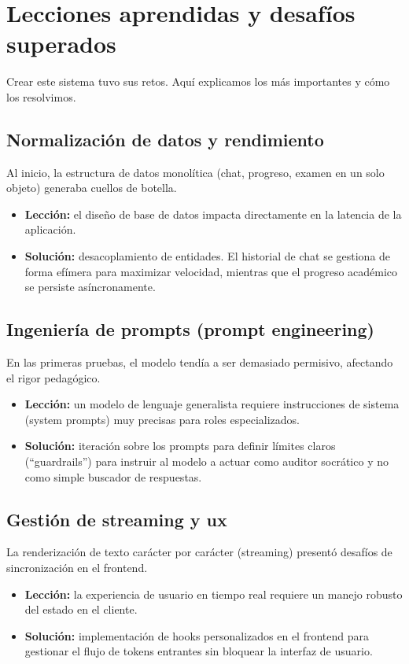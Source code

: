 \section{Lecciones aprendidas y desafíos superados}

Crear este sistema tuvo sus retos. Aquí explicamos los más importantes y cómo los resolvimos.

\subsection{Normalización de datos y rendimiento}
Al inicio, la estructura de datos monolítica (chat, progreso, examen en un solo objeto) generaba cuellos de botella.
\begin{itemize}
\item \textbf{Lección:} el diseño de base de datos impacta directamente en la latencia de la aplicación.
\item \textbf{Solución:} desacoplamiento de entidades. El historial de chat se gestiona de forma efímera para maximizar velocidad, mientras que el progreso académico se persiste asíncronamente.
\end{itemize}

\subsection{Ingeniería de prompts (prompt engineering)}
En las primeras pruebas, el modelo tendía a ser demasiado permisivo, afectando el rigor pedagógico.
\begin{itemize}
\item \textbf{Lección:} un modelo de lenguaje generalista requiere instrucciones de sistema (system prompts) muy precisas para roles especializados.
\item \textbf{Solución:} iteración sobre los prompts para definir límites claros (\enquote{guardrails}) para instruir al modelo a actuar como auditor socrático y no como simple buscador de respuestas.
\end{itemize}

\subsection{Gestión de streaming y \gls{ux}}
La renderización de texto carácter por carácter (streaming) presentó desafíos de sincronización en el frontend.
\begin{itemize}
\item \textbf{Lección:} la experiencia de usuario en tiempo real requiere un manejo robusto del estado en el cliente.
\item \textbf{Solución:} implementación de hooks personalizados en el frontend para gestionar el flujo de tokens entrantes sin bloquear la interfaz de usuario.
\end{itemize}

